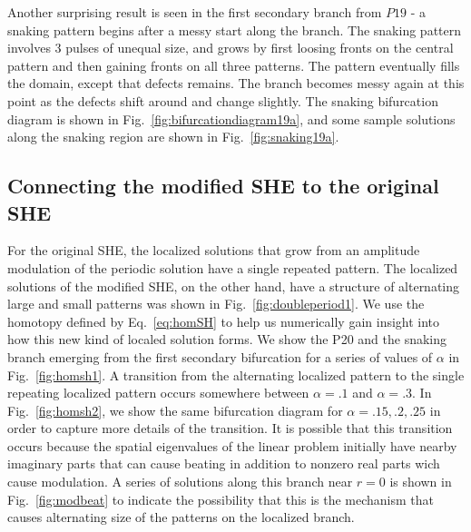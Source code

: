 \documentclass[../main/FlatMarginalStability.tex]{subfiles}
\begin{document}
Another surprising result is seen in the first secondary branch from $P19$ - a snaking pattern  begins  after a messy start along the branch.  The snaking pattern involves 3 pulses of unequal size, and grows by first loosing fronts on the central pattern and then gaining fronts on all three patterns.  The pattern eventually fills the domain, except that defects remains.  The branch becomes messy again at this point as the defects shift around and change slightly.  The snaking bifurcation diagram is shown in Fig.~\ref{fig:bifurcationdiagram19a}, and some sample solutions along the snaking region are shown in Fig.~\ref{fig:snaking19a}.
\FIGbifurcationdiagramC
\FIGsnakingB

\subsection{Connecting the modified SHE to the original SHE}

For the original SHE, the localized solutions that grow from an amplitude modulation of the periodic solution have a single repeated pattern.  The localized solutions of the modified SHE, on the other hand, have a structure of alternating large and small patterns was shown in Fig.~\ref{fig:doubleperiod1}.  We use the homotopy defined by Eq.~\ref{eq:homSH} to help us numerically gain insight into how this new kind of localed solution forms.  We show the  P20 and the snaking branch emerging from the first secondary bifurcation for a series of values of $\alpha$ in Fig.~\ref{fig:homsh1}.
\FIGhomshA
  A transition from the alternating localized pattern to the single repeating localized pattern occurs somewhere between $\alpha=.1$ and $\alpha=.3$.  In Fig.~\ref{fig:homsh2}, we show the same bifurcation diagram for $\alpha=.15,.2,.25$ in order to capture more details of the transition.   
\FIGhomshB
It is possible that this transition occurs because the spatial eigenvalues of the linear problem initially have nearby imaginary parts that can cause beating in addition to nonzero real parts wich cause modulation.   A series of solutions along this branch near $r=0$ is shown in Fig.~\ref{fig:modbeat} to indicate the possibility that this is the mechanism that causes alternating size of the patterns on the localized branch.  
\FIGmodbeat
\end{document}

